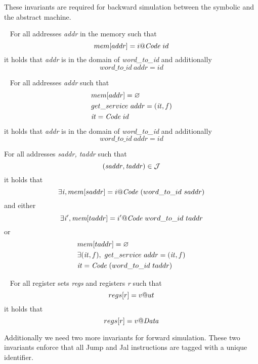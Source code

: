 These invariants are required for backward simulation between
the symbolic and the abstract machine.

\begin{definition}\label{instructions_tagged}
  ~ For all addresses \textit{addr} in the memory such that
  $$mem[addr] = i@\textit{Code}~id$$ it holds that \textit{addr}
  is in the domain of \emph{word\_to\_id} and additionally
  $$word\_to\_id ~\mathit{addr} = \mathit{id}$$
\end{definition}

\begin{definition}\label{entry_tagged}
  ~ For all addresses \textit{addr} such that
  \begin{align*}
  & mem[addr] = \varnothing\\
  & get\_service~addr = (\mathit{it},f)\\
  & \mathit{it} = \textit{Code}~id
  \end{align*}
  it holds that \textit{addr} is in the domain of \emph{word\_to\_id} and additionally
  $$word\_to\_id ~\mathit{addr} = \mathit{id}$$
\end{definition}

\begin{definition}\label{valid_jmp_tagged}
  For all addresses \textit{saddr, taddr} such that
  $$(\mathit{saddr},\mathit{taddr}) \in \mathcal{J}$$ it holds that
  $$\exists \mathit{i}, mem[saddr] = i@\textit{Code}~(word\_to\_id~saddr) $$
  and either $$\exists \mathit{i'}, \textit{mem}[taddr]
  =i'@\textit{Code}~word\_to\_id~taddr$$ or
  \begin{align*}
  & mem[taddr] = \varnothing\\
  & \exists (\mathit{it},f), ~ get\_service~addr = (\mathit{it},f)\\
  & \mathit{it} = \textit{Code}~(word\_to\_id~taddr)
  \end{align*}
\end{definition}

\begin{definition}\label{registers_tagged}
  ~ For all register sets \textit{regs} and registers \textit{r} such that
  $$regs[r] = v@ut$$ it holds that
  $$regs[r] = v@\textit{Data}$$
\end{definition}

Additionally we need two more invariants for forward
simulation. These two invariants enforce that all Jump and Jal instructions
are tagged with a unique identifier.

